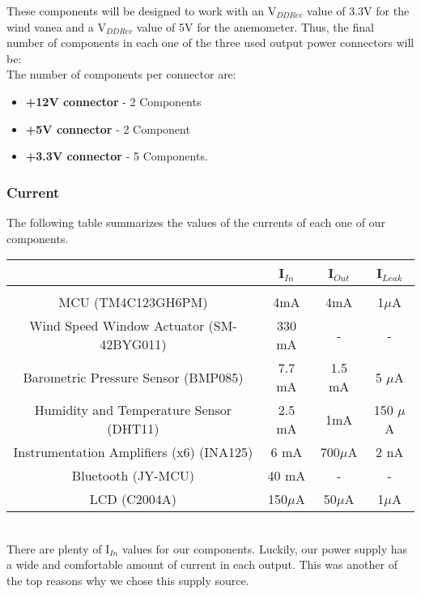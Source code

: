 			These components will be designed to work with an V$_{DD Rec}$ value of 3.3V for the wind vanea and a V$_{DD Rec}$ value of 5V for the anemometer. Thus, the final number of components in each one of the three used output power connectors will be: \\

			The number of components per connector are: 
			\begin{itemize}
			  \item \textbf{+12V connector} - 2 Components
			  \item \textbf{+5V connector} - 2 Component
			  \item \textbf{+3.3V connector} - 5 Components.
			\end{itemize} 

		\subsubsection{Current}

			The following table summarizes the values of the currents of each one of our components. 

			\begin{tabular}{|c|c|c|c|}
				\hline
				& I$_{In}$ &  I$_{Out}$ & I$_{Leak}$\\
				\hline
				& & &   \\
				MCU (TM4C123GH6PM) & 4mA & 4mA & 1$\mu$A  \\
				Wind Speed Window Actuator (SM-42BYG011) & 330 mA & - & -\\
				Barometric Pressure Sensor (BMP085) & 7.7 mA  & 1.5 mA & 5 $\mu$A \\
				Humidity and Temperature Sensor (DHT11) & 2.5 mA & 1mA & 150 $\mu$A \\
				Instrumentation Amplifiers (x6) (INA125) & 6 mA &  700$\mu$A & 2 nA  \\
				Bluetooth (JY-MCU) & 40 mA & - & - \\
				LCD (C2004A) & 150$\mu$A & 50$\mu$A & 1$\mu$A \\
				\hline
			\end{tabular} \\ 

			There are plenty of I$_{In}$ values for our components. Luckily, our power supply has a wide and comfortable amount of current in each output. This was another of the top reasons why we chose this supply source. \\

